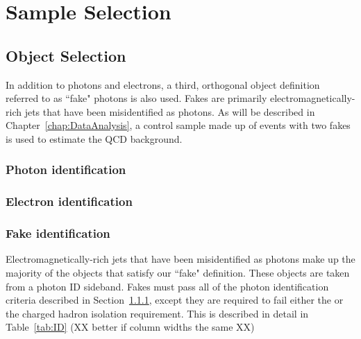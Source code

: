 \chapter{Sample Selection}
\label{chap:EventSelect}

\section{Object Selection}
\label{sec:ObjSelect}


In addition to photons and electrons, a third, orthogonal object definition referred to as ``fake" photons is also used. 
Fakes are primarily electromagnetically-rich jets that have been misidentified as photons. As will be described in Chapter~\ref{chap:DataAnalysis},
a control sample made up of events with two fakes is used to estimate the QCD background. 

\subsection{Photon identification}
\label{sec:phoID}

\subsection{Electron identification}
\label{sec:eleID}


\subsection{Fake identification}
\label{sec:fakeID}
Electromagnetically-rich jets that have been misidentified as photons make up the majority of the objects 
that satisfy our ``fake" definition. These objects are taken from a photon ID sideband. Fakes must
pass all of the photon identification criteria described in Section~\ref{sec:phoID}, except they are required to
fail either the \sigmaietaieta or the charged hadron isolation requirement. This is described in detail in Table~\ref{tab:ID}
(XX better if column widths the same XX)

